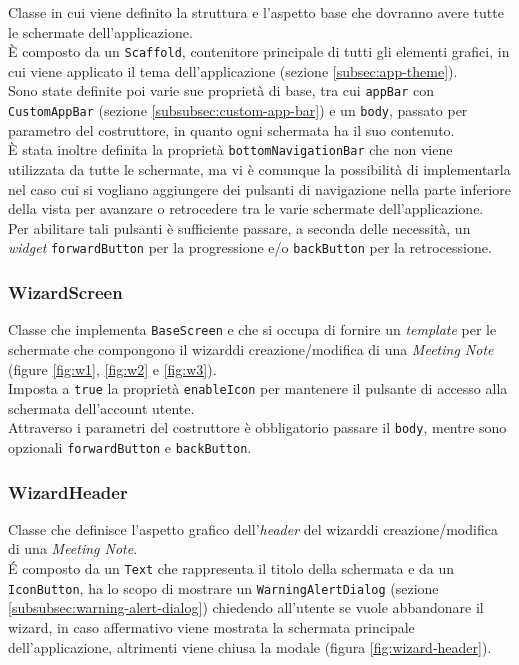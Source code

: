 Classe in cui viene definito la struttura e l'aspetto base che dovranno avere tutte le schermate dell'applicazione.\\
È composto da un \lstinline{Scaffold}\cite{site:scaffold}, contenitore principale di tutti gli elementi grafici, in cui viene applicato il tema dell'applicazione (sezione \ref{subsec:app-theme}). \\
Sono state definite poi varie sue proprietà di base, tra cui \lstinline{appBar} con \lstinline{CustomAppBar} (sezione \ref{subsubsec:custom-app-bar}) e un \lstinline{body}, passato per parametro del costruttore, in quanto ogni schermata ha il suo contenuto.\\
È stata inoltre definita la proprietà \lstinline{bottomNavigationBar} che non viene utilizzata da tutte le schermate, ma vi è comunque la possibilità di implementarla nel caso cui si vogliano aggiungere dei pulsanti di navigazione nella parte inferiore della vista per avanzare o retrocedere tra le varie schermate dell'applicazione.\\
Per abilitare tali pulsanti è sufficiente passare, a seconda delle necessità, un \emph{widget} \lstinline{forwardButton} per la progressione e/o \lstinline{backButton} per la retrocessione.

\subsubsection*{WizardScreen}
\label{subsubsec:wizard-screen}

Classe che implementa \lstinline{BaseScreen} e che si occupa di fornire un \emph{template} per le schermate che compongono il \gls{wizard}\glsoccur di creazione/modifica di una \emph{Meeting Note} (figure \ref{fig:w1}, \ref{fig:w2} e \ref{fig:w3}).\\
Imposta a \lstinline{true} la proprietà \lstinline{enableIcon} per mantenere il pulsante di accesso alla schermata dell'account utente.\\
Attraverso i parametri del costruttore è obbligatorio passare il \lstinline{body}, mentre sono opzionali \lstinline{forwardButton} e \lstinline{backButton}.

\subsubsection*{WizardHeader}
\label{subsubsec:wizard-header}

Classe che definisce l'aspetto grafico dell'\emph{header} del \gls{wizard}\glsoccur di creazione/modifica di una \emph{Meeting Note}.\\
É composto da un \lstinline{Text}\cite{site:text} che rappresenta il titolo della schermata e da un \lstinline{IconButton}\cite{site:icon-button}, ha lo scopo di mostrare un \lstinline{WarningAlertDialog} (sezione \ref{subsubsec:warning-alert-dialog}) chiedendo all'utente se vuole abbandonare il \gls{wizard}\glsoccur, in caso affermativo viene mostrata la schermata principale dell'applicazione, altrimenti viene chiusa la modale (figura \ref{fig:wizard-header}). 

